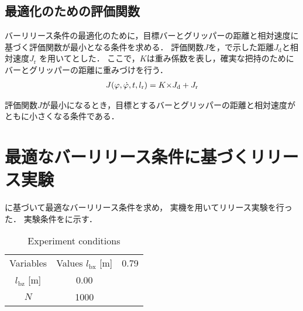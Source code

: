         \subsection{最適化のための評価関数}
        
        バーリリース条件の最適化のために，目標バーとグリッパーの距離と相対速度に基づく評価関数が最小となる条件を求める．
        評価関数$J$を，で示した距離$J_{\mathrm{d}}$と相対速度$J_{\mathrm{r}}$
        を用いてとした．
        ここで，$K$は重み係数を表し，確実な把持のためにバーとグリッパーの距離に重みづけを行う．
        \begin{eqnarray}
          \equlabel{J}
          J(\varphi,\dot{\varphi},t,l_{\mathrm{r}})=K{\times}J_{\mathrm{d}}+J_{\mathrm{r}}
        \end{eqnarray}
        
        評価関数$J$が最小になるとき，目標とするバーとグリッパーの距離と相対速度がともに小さくなる条件である．


      \section{最適なバーリリース条件に基づくリリース実験}
          
        に基づいて最適なバーリリース条件を求め，
        実機を用いてリリース実験を行った．
        実験条件をに示す．

        \begin{table}[tb]
          \begin{center}
            \caption{Experiment conditions}
            \begin{tabular}{c|cc}
              \hline
              Variables & Values 
              \hline
              $l_{\mathrm{bx}}$ [m] & 0.79 \\
              $l_{\mathrm{bz}}$ [m] & 0.00 \\
              $N$ & 1000 \\
              \hline
            \end{tabular}
          \end{center}
        \end{table}
        


